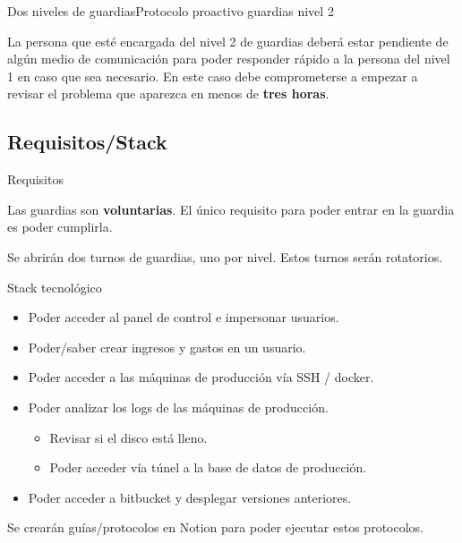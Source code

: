 \documentclass[12pt, aspectratio=169]{beamer} %
\begin{document}
\begin{frame}{Dos niveles de guardias}{Protocolo proactivo guardias nivel 2}

  La persona que esté encargada del nivel 2 de guardias deberá estar pendiente de algún medio de comunicación para poder responder rápido a la persona del nivel 1 en caso que sea necesario. En este caso debe comprometerse a empezar a revisar el problema que aparezca en menos de \textbf{tres horas}.

\end{frame}

\subsection{Requisitos/Stack}

\begin{frame}{Requisitos}

  Las guardias son \textbf{voluntarias}. El único requisito para poder entrar en la guardia es poder cumplirla.

  Se abrirán dos turnos de guardias, uno por nivel. Estos turnos serán rotatorios.

\end{frame}

\begin{frame}{Stack tecnológico}
  
  \begin{itemize}
    \item Poder acceder al panel de control e impersonar usuarios.
    \item Poder/saber crear ingresos y gastos en un usuario.
    \item Poder acceder a las máquinas de producción vía SSH / docker.
    \item Poder analizar los logs de las máquinas de producción.
      \begin{itemize}
        \item Revisar si el disco está lleno.
        \item Poder acceder vía túnel a la base de datos de producción.
        \end{itemize}
      \item Poder acceder a bitbucket y desplegar versiones anteriores.
    \end{itemize}

    Se crearán guías/protocolos en Notion para poder ejecutar estos protocolos.
  
\end{frame}
\end{document}
